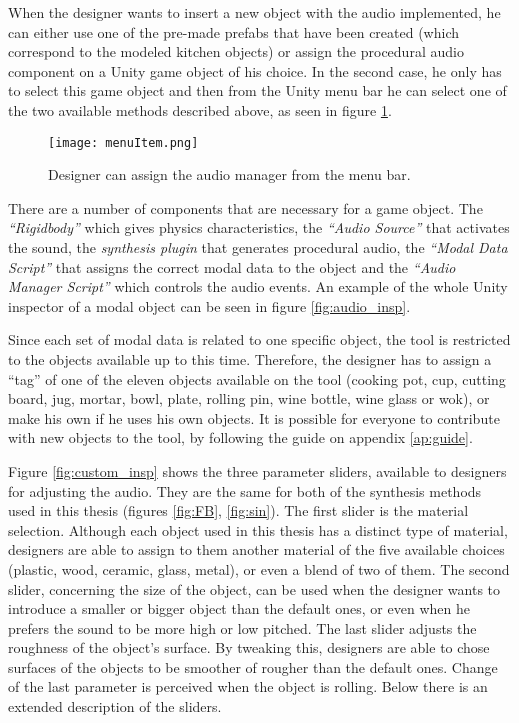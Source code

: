 When the designer wants to insert a new object with the audio implemented, he can either use one of the pre-made prefabs that have been created (which correspond to the modeled kitchen objects) or assign the procedural audio component on a Unity\textsuperscript{\textregistered} game object of his choice. In the second case, he only has to select this game object and then from the Unity\textsuperscript{\textregistered} menu bar he can select one of the two available methods described above, as seen in figure \ref{fig:menu_item}.

\begin{figure}[H]
  \centering
    \texttt{[image: menuItem.png]}
      \caption{Designer can assign the audio manager from the menu bar.}
      \label{fig:menu_item}
\end{figure}

There are a number of components that are necessary for a game object. The \textit{``Rigidbody''} which gives physics characteristics, the \textit{``Audio Source''} that activates the sound, the \textit{synthesis plugin} that generates  procedural audio, the \textit{``Modal Data Script''} that assigns the correct modal data to the object and the \textit{``Audio Manager Script''} which controls the audio events. An example of the whole Unity\textsuperscript{\textregistered} inspector of a modal object can be seen in figure \ref{fig:audio_insp}.

Since each set of modal data is related to one specific object, the tool is restricted to the objects available up to this time. Therefore, the designer has to assign a ``tag'' of one of the eleven objects available on the tool (cooking pot, cup, cutting board, jug, mortar, bowl, plate, rolling pin, wine bottle, wine glass or wok), or make his own if he uses his own objects. It is possible for everyone to contribute with new objects to the tool, by following the guide on appendix \ref{ap:guide}.

Figure \ref{fig:custom_insp} shows the three parameter sliders, available to designers for adjusting the audio. They are the same for both of the synthesis methods  used in this thesis (figures \ref{fig:FB}, \ref{fig:sin}). The first slider is the material selection. Although each object used in this thesis has a distinct type of material, designers are able to assign to them another material of the five available choices (plastic, wood, ceramic, glass, metal), or even a blend of two of them. The second slider, concerning the size of the object, can be used when the designer wants to introduce a smaller or bigger object than the default ones, or even when he prefers the sound to be more high or low pitched. The last slider adjusts the roughness of the object's surface. By tweaking this, designers are able to chose surfaces of the objects to be smoother of rougher than the default ones. Change of the last parameter is perceived when the object is rolling. Below there is an extended description of the sliders.

